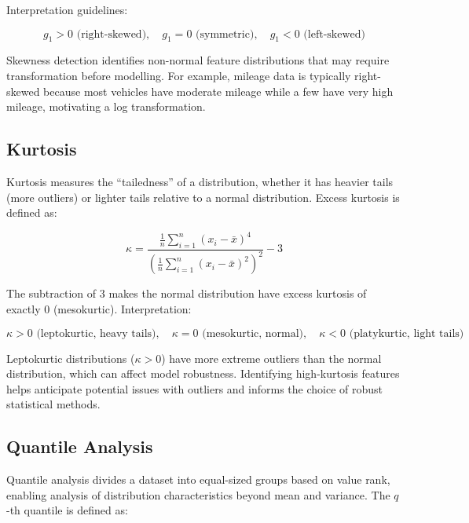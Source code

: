\documentclass[10pt,a4paper]{article}
\begin{document}
Interpretation guidelines:

\begin{equation}
g_1 > 0 \text{ (right-skewed)}, \quad g_1 = 0 \text{ (symmetric)}, \quad g_1 < 0 \text{ (left-skewed)}
\label{eq:skewness-interpretation}
\end{equation}

Skewness detection identifies non-normal feature distributions that may require transformation before modelling. For example, mileage data is typically right-skewed because most vehicles have moderate mileage while a few have very high mileage, motivating a log transformation.

\subsection{Kurtosis}
\label{sec:kurtosis}

Kurtosis measures the ``tailedness'' of a distribution, whether it has heavier tails (more outliers) or lighter tails relative to a normal distribution. Excess kurtosis is defined as:

\begin{equation}
\kappa = \frac{\frac{1}{n}\sum_{i=1}^{n}(x_i - \bar{x})^4}{\left(\frac{1}{n}\sum_{i=1}^{n}(x_i - \bar{x})^2\right)^2} - 3
\label{eq:kurtosis}
\end{equation}

The subtraction of 3 makes the normal distribution have excess kurtosis of exactly 0 (mesokurtic). Interpretation:

\begin{equation}
\kappa > 0 \text{ (leptokurtic, heavy tails)}, \quad \kappa = 0 \text{ (mesokurtic, normal)}, \quad \kappa < 0 \text{ (platykurtic, light tails)}
\label{eq:kurtosis-interpretation}
\end{equation}

Leptokurtic distributions ($\kappa > 0$) have more extreme outliers than the normal distribution, which can affect model robustness. Identifying high-kurtosis features helps anticipate potential issues with outliers and informs the choice of robust statistical methods.

\subsection{Quantile Analysis}
\label{sec:quantile-analysis}

Quantile analysis divides a dataset into equal-sized groups based on value rank, enabling analysis of distribution characteristics beyond mean and variance. The $q$-th quantile is defined as:
\end{document}
